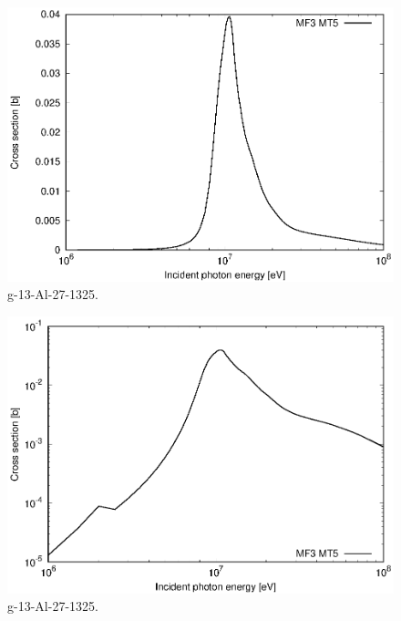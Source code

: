 \begin{figure}
 \includegraphics[width=\linewidth]{eps/g_13-Al-27_1325.eps}
  \caption{g-13-Al-27-1325.}
\end{figure}
\begin{figure}
 \includegraphics[width=\linewidth]{eps-log/g_13-Al-27_1325.eps}
 \caption{g-13-Al-27-1325.}
\end{figure}
\newpage \clearpage

